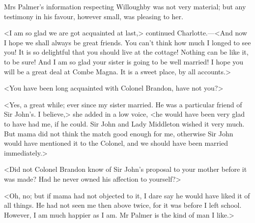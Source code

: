 Mrs Palmer's information respecting Willoughby was not very material; but any testimony in his favour, however small, was pleasing to her.

<I am so glad we are got acquainted at last,> continued Charlotte.—<And now I hope we shall always be great friends. You can't think how much I longed to see you! It is so delightful that you should live at the cottage! Nothing can be like it, to be sure! And I am so glad your sister is going to be well married! I hope you will be a great deal at Combe Magna. It is a sweet place, by all accounts.>

<You have been long acquainted with Colonel Brandon, have not you?>

<Yes, a great while; ever since my sister married. He was a particular friend of Sir John's. I believe,> she added in a low voice, <he would have been very glad to have had me, if he could. Sir John and Lady Middleton wished it very much. But mama did not think the match good enough for me, otherwise Sir John would have mentioned it to the Colonel, and we should have been married immediately.>

<Did not Colonel Brandon know of Sir John's proposal to your mother before it was made? Had he never owned his affection to yourself?>

<Oh, no; but if mama had not objected to it, I dare say he would have liked it of all things. He had not seen me then above twice, for it was before I left school. However, I am much happier as I am. Mr Palmer is the kind of man I like.>

\begin{letter}
  \enlargethispage{\baselineskip}
\end{letter}